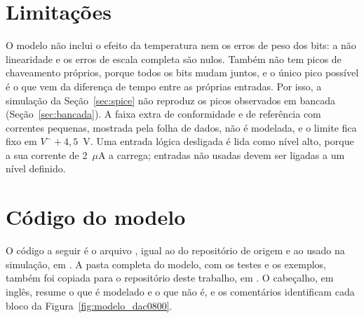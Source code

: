 \section{Limitações}

O modelo não inclui o efeito da temperatura nem os erros de peso dos bits: a não linearidade e os erros de escala completa são nulos. Também não tem picos de chaveamento próprios, porque todos os bits mudam juntos, e o único pico possível é o que vem da diferença de tempo entre as próprias entradas. Por isso, a simulação da Seção~\ref{sec:spice} não reproduz os picos observados em bancada (Seção~\ref{sec:bancada}). A faixa extra de conformidade e de referência com correntes pequenas, mostrada pela folha de dados, não é modelada, e o limite fica fixo em \(V^- + 4{,}5\)~V. Uma entrada lógica desligada é lida como nível alto, porque a sua corrente de 2~\(\mu\)A a carrega; entradas não usadas devem ser ligadas a um nível definido.

\section{Código do modelo}

O código a seguir é o arquivo , igual ao do repositório de origem e ao usado na simulação, em . A pasta completa do modelo, com os testes e os exemplos, também foi copiada para o repositório deste trabalho, em . O cabeçalho, em inglês, resume o que é modelado e o que não é, e os comentários identificam cada bloco da Figura~\ref{fig:modelo_dac0800}.


